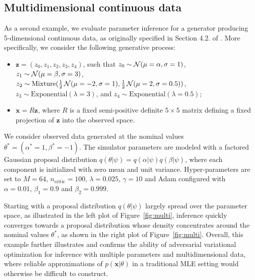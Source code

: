 \documentclass[twocolumn,superscriptaddress,aps]{revtex4-1}
\theoremstyle{plain}
\begin{document}
\subsection{Multidimensional continuous data}

As a second example, we evaluate parameter inference for a generator producing
5-dimensional continuous data, as originally specified in Section 4.2. of
\citep{cranmer2015approximating}. More specifically, we consider the following
generative process:
\begin{itemize}
    \item $\mathbf{z} = (z_0, z_1, z_2, z_3, z_4)$, such that
        $z_0 \sim {\cal N}(\mu=\alpha, \sigma=1)$,
        $z_1 \sim {\cal N}(\mu=\beta, \sigma=3)$,
        $z_2 \sim {\text{Mixture}}(\frac{1}{2}\,{\cal N}(\mu=-2, \sigma=1), \frac{1}{2}\,{\cal N}(\mu=2, \sigma=0.5))$,
        $z_3 \sim {\text{Exponential}(\lambda=3)}$, and
        $z_4 \sim {\text{Exponential}(\lambda=0.5)}$;
    \item $\mathbf{x} = R  \mathbf{z}$, where $R$ is a fixed
    semi-positive definite $5 \times 5$ matrix defining a fixed projection
    of $\mathbf{z}$ into the observed space.
\end{itemize}
We consider observed data generated at the nominal values $\theta^* = (\alpha^*=1,\beta^*=-1)$.
The simulator parameters are modeled with a factored Gaussian
proposal distribution $q(\theta|\psi) = q(\alpha|\psi) q(\beta|\psi)$, where each component is
initialized with zero mean and unit variance. Hyper-parameters are set to $M=64$, $n_\text{critic}=100$, $\lambda=0.025$, $\gamma=10$ and
Adam configured with $\alpha=0.01$, $\beta_1=0.9$ and $\beta_2=0.999$.

Starting with a proposal distribution $q(\theta|\psi)$ largely spread over
the parameter space, as illustrated in the left plot of Figure~\ref{fig:multi},
inference quickly converges towards a proposal distribution whose density
concentrates around the nominal values $\theta^*$, as shown in the right plot of Figure~\ref{fig:multi}.
Overall, this example further illustrates and confirms the ability of adversarial
variational optimization for inference with multiple parameters and multidimensional
data, where reliable approximations of $p(\mathbf{x}|\theta)$ in a traditional
MLE setting would otherwise be difficult to construct.
\end{document}
